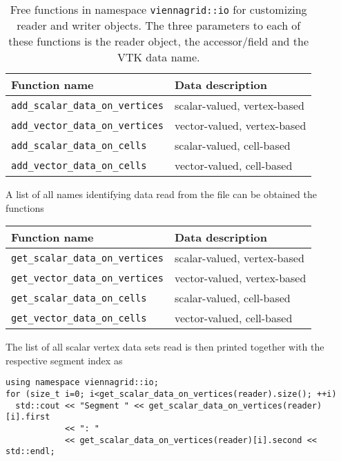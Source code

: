  \begin{table}[tb]
 \begin{center}
  \begin{tabular}{|l|l|}
   \hline
   Function name & Data description \\
   \hline
   \lstinline|add_scalar_data_on_vertices| & scalar-valued, vertex-based \\
   \lstinline|add_vector_data_on_vertices| & vector-valued, vertex-based \\
   \hline
   \lstinline|add_scalar_data_on_cells| & scalar-valued, cell-based \\
   \lstinline|add_vector_data_on_cells| & vector-valued, cell-based \\
   \hline
  \end{tabular}
 \end{center}
 \caption{Free functions in namespace \lstinline|viennagrid::io| for customizing reader and writer objects. The three parameters to each of these functions is the reader object, the accessor/field and the VTK data name.}
 \label{tab:customizing-io}
 \end{table}

 A list of all names identifying data read from the file can be obtained the functions
 \begin{center}
  \begin{tabular}{|l|l|}
   \hline
   Function name & Data description \\
   \hline
   \lstinline|get_scalar_data_on_vertices| & scalar-valued, vertex-based \\
   \lstinline|get_vector_data_on_vertices| & vector-valued, vertex-based \\
   \hline
   \lstinline|get_scalar_data_on_cells| & scalar-valued, cell-based \\
   \lstinline|get_vector_data_on_cells| & vector-valued, cell-based \\
   \hline
  \end{tabular}
 \end{center}

 The list of all scalar vertex data sets read is then printed together with the respective segment index as
 \begin{lstlisting}
using namespace viennagrid::io;
for (size_t i=0; i<get_scalar_data_on_vertices(reader).size(); ++i)
  std::cout << "Segment " << get_scalar_data_on_vertices(reader)[i].first
            << ": "
            << get_scalar_data_on_vertices(reader)[i].second << std::endl;
 \end{lstlisting}



